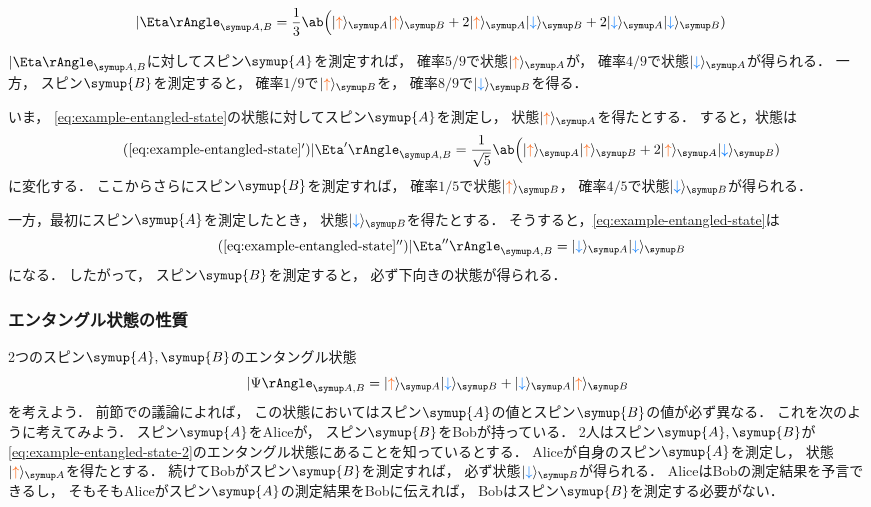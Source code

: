 \documentclass[
]{sotsu}
\newcommand{\bitone}{\mathcolor{fire}{\uparrow}}
\newcommand{\bittwo}{\mathcolor{water}{\downarrow}}
\begin{document}
\quad 
\begin{equation}
    \label{eq:example-entangled-state}
    \begin{split}
        \Ket{\Eta}<A,B>
        &= \frac{1}{3} \ab\Big(
            \ket{\bitone}<A> \ket{\bitone}<B>
            + 2 \ket{\bitone}<A> \ket{\bittwo}<B>
            + 2 \ket{\bittwo}<A> \ket{\bittwo}<B>
        )
    \end{split}
\end{equation}

$\Ket{\Eta}<A,B>$に対してスピン$\symup{A}$を測定すれば，
確率$5/9$で状態$\ket{\bitone}<A>$が，
確率$4/9$で状態$\ket{\bittwo}<A>$が得られる．
一方，
スピン$\symup{B}$を測定すると，
確率$1/9$で$\ket{\bitone}<B>$を，
確率$8/9$で$\ket{\bittwo}<B>$を得る．

いま，
\cref{eq:example-entangled-state}の状態に対してスピン$\symup{A}$を測定し，
状態$\ket{\bitone}<A>$を得たとする．
すると，状態は
\begin{equation*}
    \tag{\ref*{eq:example-entangled-state}$'$}
    \Ket{\Eta'}<A,B> = \frac{1}{\sqrt{5}} \ab\Big(
        \ket{\bitone}<A> \ket{\bitone}<B>
        + 2 \ket{\bitone}<A> \ket{\bittwo}<B>
    )
\end{equation*}
に変化する．
ここからさらにスピン$\symup{B}$を測定すれば，
確率$1/5$で状態$\ket{\bitone}<B>$，
確率$4/5$で状態$\ket{\bittwo}<B>$が得られる．

一方，最初にスピン$\symup{A}$を測定したとき，
状態$\ket{\bittwo}<B>$を得たとする．
そうすると，\cref{eq:example-entangled-state}は
\begin{equation*}
    \tag{\ref*{eq:example-entangled-state}$''$}
    \Ket{\Eta''}<A,B> = \ket{\bittwo}<A> \ket{\bittwo}<B>
\end{equation*}
になる．
したがって，
スピン$\symup{B}$を測定すると，
必ず下向きの状態が得られる．



\subsubsection{エンタングル状態の性質}

2つのスピン$\symup{A}, \symup{B}$のエンタングル状態
\begin{equation}
    \label{eq:example-entangled-state-2}
    \Ket{\Psi}<A,B> = \ket{\bitone}<A> \ket{\bittwo}<B> + \ket{\bittwo}<A> \ket{\bitone}<B>
\end{equation}
を考えよう．
前節での議論によれば，
この状態においてはスピン$\symup{A}$の値とスピン$\symup{B}$の値が必ず異なる．
これを次のように考えてみよう．
スピン$\symup{A}$をAliceが，
スピン$\symup{B}$をBobが持っている．
2人はスピン$\symup{A}, \symup{B}$が\cref{eq:example-entangled-state-2}のエンタングル状態にあることを知っているとする．
Aliceが自身のスピン$\symup{A}$を測定し，
状態$\ket{\bitone}<A>$を得たとする．
続けてBobがスピン$\symup{B}$を測定すれば，
必ず状態$\ket{\bittwo}<B>$が得られる．
AliceはBobの測定結果を予言できるし，
そもそもAliceがスピン$\symup{A}$の測定結果をBobに伝えれば，
Bobはスピン$\symup{B}$を測定する必要がない．
\end{document}
